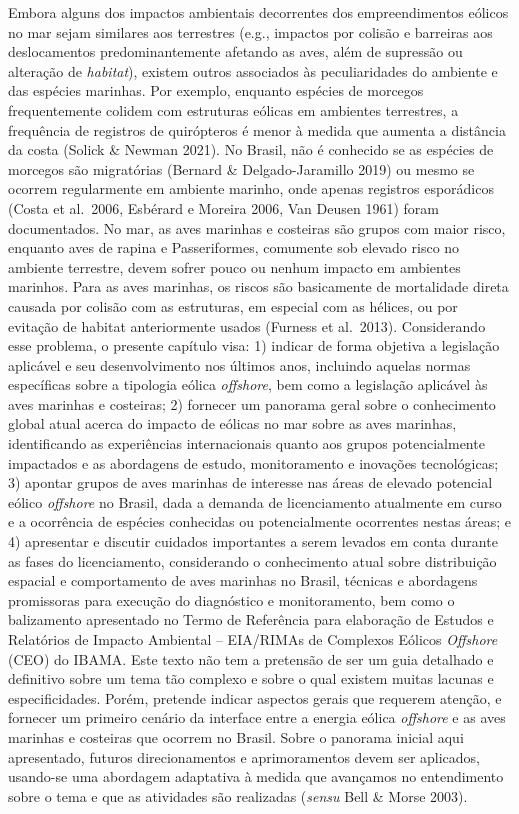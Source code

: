 \documentclass[
  oneside]{scrbook}
\begin{document}
Embora alguns dos impactos ambientais decorrentes dos empreendimentos eólicos no mar sejam similares aos terrestres (e.g., impactos por colisão e barreiras aos deslocamentos predominantemente afetando as aves, além de supressão ou alteração de \emph{habitat}), existem outros associados às peculiaridades do ambiente e das espécies marinhas. Por exemplo, enquanto espécies de morcegos frequentemente colidem com estruturas eólicas em ambientes terrestres, a frequência de registros de quirópteros é menor à medida que aumenta a distância da costa (Solick \& Newman 2021). No Brasil, não é conhecido se as espécies de morcegos são migratórias (Bernard \& Delgado-Jaramillo 2019) ou mesmo se ocorrem regularmente em ambiente marinho, onde apenas registros esporádicos (Costa et al.~2006, Esbérard e Moreira 2006, Van Deusen 1961) foram documentados. No mar, as aves marinhas e costeiras são grupos com maior risco, enquanto aves de rapina e Passeriformes, comumente sob elevado risco no ambiente terrestre, devem sofrer pouco ou nenhum impacto em ambientes marinhos. Para as aves marinhas, os riscos são basicamente de mortalidade direta causada por colisão com as estruturas, em especial com as hélices, ou por evitação de habitat anteriormente usados (Furness et al.~2013). Considerando esse problema, o presente capítulo visa: 1) indicar de forma objetiva a legislação aplicável e seu desenvolvimento nos últimos anos, incluindo aquelas normas específicas sobre a tipologia eólica \emph{offshore}, bem como a legislação aplicável às aves marinhas e costeiras; 2) fornecer um panorama geral sobre o conhecimento global atual acerca do impacto de eólicas no mar sobre as aves marinhas, identificando as experiências internacionais quanto aos grupos potencialmente impactados e as abordagens de estudo, monitoramento e inovações tecnológicas; 3) apontar grupos de aves marinhas de interesse nas áreas de elevado potencial eólico \emph{offshore} no Brasil, dada a demanda de licenciamento atualmente em curso e a ocorrência de espécies conhecidas ou potencialmente ocorrentes nestas áreas; e 4) apresentar e discutir cuidados importantes a serem levados em conta durante as fases do licenciamento, considerando o conhecimento atual sobre distribuição espacial e comportamento de aves marinhas no Brasil, técnicas e abordagens promissoras para execução do diagnóstico e monitoramento, bem como o balizamento apresentado no Termo de Referência para elaboração de Estudos e Relatórios de Impacto Ambiental -- EIA/RIMAs de Complexos Eólicos \emph{Offshore} (CEO) do IBAMA. Este texto não tem a pretensão de ser um guia detalhado e definitivo sobre um tema tão complexo e sobre o qual existem muitas lacunas e especificidades. Porém, pretende indicar aspectos gerais que requerem atenção, e fornecer um primeiro cenário da interface entre a energia eólica \emph{offshore} e as aves marinhas e costeiras que ocorrem no Brasil. Sobre o panorama inicial aqui apresentado, futuros direcionamentos e aprimoramentos devem ser aplicados, usando-se uma abordagem adaptativa à medida que avançamos no entendimento sobre o tema e que as atividades são realizadas (\emph{sensu} Bell \& Morse 2003).
\end{document}
